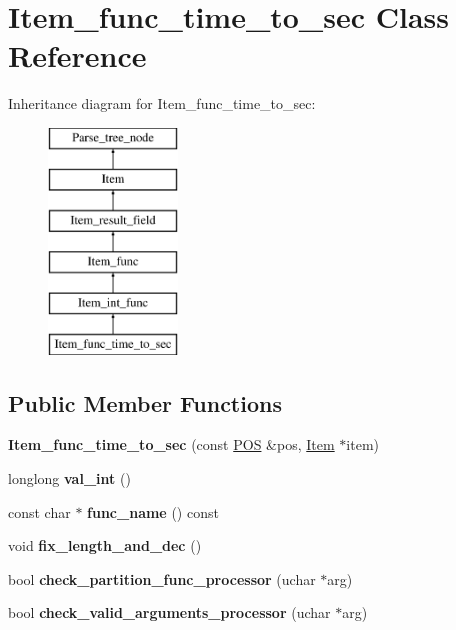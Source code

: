 \hypertarget{classItem__func__time__to__sec}{}\section{Item\+\_\+func\+\_\+time\+\_\+to\+\_\+sec Class Reference}
\label{classItem__func__time__to__sec}
Inheritance diagram for Item\+\_\+func\+\_\+time\+\_\+to\+\_\+sec\+:\begin{figure}[H]
\begin{center}
\leavevmode
\includegraphics[height=6.000000cm]{classItem__func__time__to__sec}
\end{center}
\end{figure}
\subsection*{Public Member Functions}
\begin{DoxyCompactItemize}
\item 
\mbox{\label{classItem__func__time__to__sec_ae61f58038031417b0a672f2365a02c60}} 
{\bfseries Item\+\_\+func\+\_\+time\+\_\+to\+\_\+sec} (const \mbox{\hyperlink{structYYLTYPE}{P\+OS}} \&pos, \mbox{\hyperlink{classItem}{Item}} $\ast$item)
\item 
\mbox{\label{classItem__func__time__to__sec_a5bc8566bea9da13dc21b916b51ea1097}} 
longlong {\bfseries val\+\_\+int} ()
\item 
\mbox{\label{classItem__func__time__to__sec_a3749a28c2ba15298aca81bb59f73aea7}} 
const char $\ast$ {\bfseries func\+\_\+name} () const
\item 
\mbox{\label{classItem__func__time__to__sec_abe13dc5bd253f1c2d32ceb53f1ef081a}} 
void {\bfseries fix\+\_\+length\+\_\+and\+\_\+dec} ()
\item 
\mbox{\label{classItem__func__time__to__sec_aeab06ef81b892792ab4971a901058899}} 
bool {\bfseries check\+\_\+partition\+\_\+func\+\_\+processor} (uchar $\ast$arg)
\item 
\mbox{\label{classItem__func__time__to__sec_a0868f6735eacd1003df12ee9c4a673ed}} 
bool {\bfseries check\+\_\+valid\+\_\+arguments\+\_\+processor} (uchar $\ast$arg)
\end{DoxyCompactItemize}
